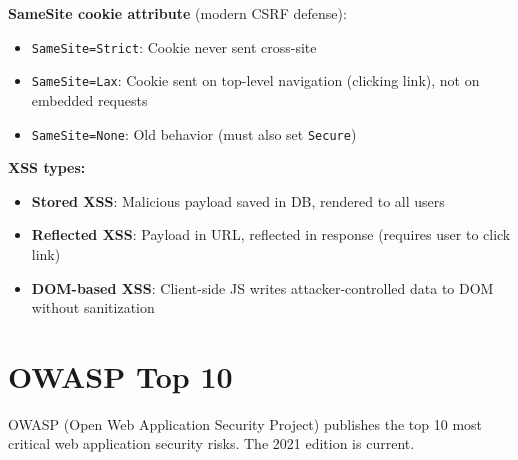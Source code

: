 \documentclass[11pt]{article}
\providecommand{\tightlist}{\setlength{\itemsep}{1pt}\setlength{\parskip}{0pt}}
\begin{document}
\textbf{SameSite cookie attribute} (modern CSRF defense):

\begin{itemize}
\tightlist
\item
  \texttt{SameSite=Strict}: Cookie never sent cross-site
\item
  \texttt{SameSite=Lax}: Cookie sent on top-level navigation (clicking link), not on embedded requests
\item
  \texttt{SameSite=None}: Old behavior (must also set \texttt{Secure})
\end{itemize}

\textbf{XSS types:}

\begin{itemize}
\tightlist
\item
  \textbf{Stored XSS}: Malicious payload saved in DB, rendered to all users
\item
  \textbf{Reflected XSS}: Payload in URL, reflected in response (requires user to click link)
\item
  \textbf{DOM-based XSS}: Client-side JS writes attacker-controlled data to DOM without sanitization
\end{itemize}

\section{OWASP Top 10}\label{owasp-top-10}

OWASP (Open Web Application Security Project) publishes the top 10 most critical web application security risks. The 2021 edition is current.
\end{document}
